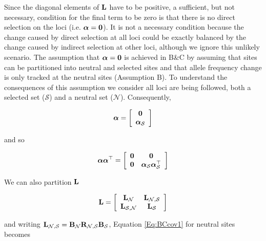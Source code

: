 \documentclass[12pt]{article}
\begin{document}
\begin{bibunit}
Since the diagonal elements of ${\bf L}$ have to be positive, a sufficient, but not necessary, condition for the final term to be zero is that there is no direct selection on the loci (i.e. $\boldsymbol{\alpha}={\bf 0}$). It is not a necessary condition because the change caused by direct selection at all loci could be exactly balanced by the change caused by indirect selection at other loci, although we ignore this unlikely scenario. The assumption that $\boldsymbol{\alpha}={\bf 0}$ is achieved in B\&C by assuming that sites can be partitioned into neutral and selected sites and that allele frequency change is only tracked at the neutral sites (Assumption B). To understand the consequences of this assumption we consider all loci are being followed, both a selected set (${\mathcal S}$) and a neutral set (${\mathcal N}$). Consequently,

\begin{equation}
\boldsymbol{\alpha}=
\left[
\begin{array}{c}
{\bf 0}\\
\boldsymbol{\alpha}_{\mathcal S}\\
\end{array}
\right]
\end{equation}

and so

\begin{equation}
\boldsymbol{\alpha}\boldsymbol{\alpha}^{\top}=
\left[
\begin{array}{cc}
{\bf 0}&{\bf 0}\\
{\bf 0}&\boldsymbol{\alpha}_{\mathcal S}\boldsymbol{\alpha}^{\top}_{\mathcal S}\\
\end{array}
\right]
\end{equation}

We can also partition ${\bf L}$

\begin{equation}
{\bf L}=
\left[
\begin{array}{cc}
{\bf L}_{\mathcal N}&{\bf L}_{{\mathcal N}, {\mathcal S}}\\
{\bf L}_{{\mathcal S}, {\mathcal N}}&{\bf L}_{\mathcal S}\\
\end{array}
\right]
\end{equation}

and writing ${\bf L}_{{\mathcal N}, {\mathcal S}} = {\bf B}_{{\mathcal N}}{\bf R}_{{\mathcal N}, {\mathcal S}}{\bf B}_{{\mathcal S}}$, Equation \ref{Eq:BCcov1} for neutral sites becomes


\end{bibunit}
\end{document}
